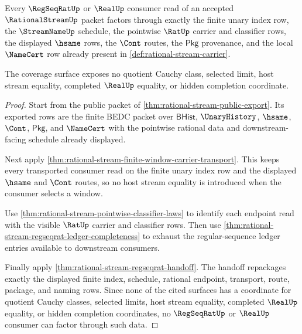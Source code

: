 \begin{theorem}\label{thm:rational-stream-regseqrat-realup-consumer-coverage}
Every $\RegSeqRatUp$ or $\RealUp$ consumer read of an accepted
$\RationalStreamUp$ packet factors through exactly the finite unary index row,
the $\StreamNameUp$ schedule, the pointwise $\RatUp$ carrier and classifier
rows, the displayed $\hsame$ rows, the $\Cont$ routes, the $\mathsf{Pkg}$
provenance, and the local $\NameCert$ row already present in
\autoref{def:rational-stream-carrier}.

The coverage surface exposes no quotient Cauchy class, selected limit, host
stream equality, completed $\RealUp$ equality, or hidden completion coordinate.
\end{theorem}
\begin{proof}
Start from the public packet of \autoref{thm:rational-stream-public-export}.
Its exported rows are the finite BEDC packet over $\mathsf{BHist}$,
$\UnaryHistory$, $\hsame$, $\Cont$, $\mathsf{Pkg}$, and $\NameCert$ with the
pointwise rational data and downstream-facing schedule already displayed.

Next apply \autoref{thm:rational-stream-finite-window-carrier-transport}. This
keeps every transported consumer read on the finite unary index row and the
displayed $\hsame$ and $\Cont$ routes, so no host stream equality is introduced
when the consumer selects a window.

Use \autoref{thm:rational-stream-pointwise-classifier-laws} to identify each
endpoint read with the visible $\RatUp$ carrier and classifier rows. Then use
\autoref{thm:rational-stream-regseqrat-ledger-completeness} to exhaust the
regular-sequence ledger entries available to downstream consumers.

Finally apply \autoref{thm:rational-stream-regseqrat-handoff}. The handoff
repackages exactly the displayed finite index, schedule, rational endpoint,
transport, route, package, and naming rows. Since none of the cited surfaces has
a coordinate for quotient Cauchy classes, selected limits, host stream equality,
completed $\RealUp$ equality, or hidden completion coordinates, no
$\RegSeqRatUp$ or $\RealUp$ consumer can factor through such data.
\end{proof}

